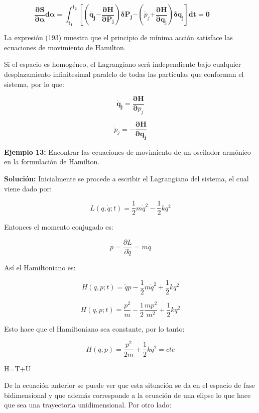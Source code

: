 \documentclass[]{article}
\begin{document}
\[\frac{\mathbf{\partial S}}{\mathbf{\partial\alpha}}\mathbf{d\alpha =}\int_{\mathbf{t}_{\mathbf{1}}}^{\mathbf{t}_{\mathbf{2}}}\left\lbrack \left( {\dot{\mathbf{q}}}_{\mathbf{j}}\mathbf{-}\frac{\mathbf{\partial H}}{\mathbf{\partial}\mathbf{P}_{\mathbf{j}}} \right)\mathbf{\delta}\mathbf{P}_{\mathbf{j}}\mathbf{-}\left( {\dot{p}}_{j}\mathbf{+}\frac{\mathbf{\partial H}}{\mathbf{\partial}\mathbf{q}_{\mathbf{j}}} \right)\mathbf{\delta}\mathbf{q}_{\mathbf{j}} \right\rbrack\mathbf{dt = 0\ \ \ \ \ \ \ \ \ \ \ }\]

La expresión (193) muestra que el principio de mínima acción satisface
las ecuaciones de movimiento de Hamilton.

Si el espacio es homogéneo, el Lagrangiano será independiente bajo
cualquier desplazamiento infinitesimal paralelo de todas las partículas
que conforman el sistema, por lo que:

\[{\dot{\mathbf{q}}}_{\mathbf{j}}\mathbf{=}\frac{\mathbf{\partial H}}{\mathbf{\partial}p_{j}}\]

\[{\dot{p}}_{j}\mathbf{= -}\frac{\mathbf{\partial H}}{\mathbf{\partial}\mathbf{q}_{\mathbf{j}}}\]

\textbf{Ejemplo 13:} Encontrar las ecuaciones de movimiento de un
oscilador armónico en la formulación de Hamilton.

\textbf{Solución:} Inicialmente se procede a escribir el Lagrangiano del
sistema, el cual viene dado por:

\[L\left( q,\dot{q};t \right) = \frac{1}{2}m{\dot{q}}^{2} - \frac{1}{2}kq^{2}\]

Entonces el momento conjugado es:

\[p = \frac{\partial L}{\partial\dot{q}} = m\dot{q}\]

Así el Hamiltoniano es:

\[H(q,p;t) = \dot{q}p - \frac{1}{2}m{\dot{q}}^{2} + \frac{1}{2}kq^{2}\]

\[H(q,p;t) = \frac{p^{2}}{m} - \frac{1}{2}\frac{mp^{2}}{m^{2}} + \frac{1}{2}kq^{2}\]

Esto hace que el Hamiltoniano sea constante, por lo tanto:

\[H(q,p) = \frac{p^{2}}{2m} + \frac{1}{2}kq^{2} = cte\]

H=T+U

De la ecuación anterior se puede ver que esta situación se da en el
espacio de fase bidimensional y que además corresponde a la ecuación de
una elipse lo que hace que sea una trayectoria unidimensional. Por otro
lado:
\end{document}
